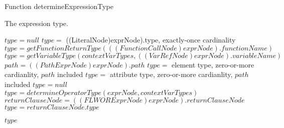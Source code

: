 \begin{algorithm}
\caption{Function determineExpressionType}
\label{ALG_func_determineExpressionType}
\begin{algorithmic}[1]
\ENSURE The expression type.

\STATE $type = null$
     \STATE $type =$ ((LiteralNode)exprNode).type, exactly-once cardinality
     \STATE $type = getFunctionReturnType(((FunctionCallNode)exprNode).functionName)$
     \STATE $type = getVariableType(contextVarTypes, ((VarRefNode)exprNode).variableName)$
     \STATE $path = ((PathExprNode)exprNode).path$
         \STATE $type =$ element type, zero-or-more cardianlity, $path$ included
         \STATE $type =$ attribute type, zero-or-more cardianlity, $path$ included
     \ELSE
         \STATE $type = null$
     \ENDIF
{}
     \STATE $type = determineOperatorType(exprNode, contextVarTypes)$
     \STATE $returnClauseNode = ((FLWORExprNode)exprNode).returnClauseNode$
     \STATE $type = returnClauseNode.type$
\ENDIF

\RETURN $type$
\end{algorithmic}
\end{algorithm}


